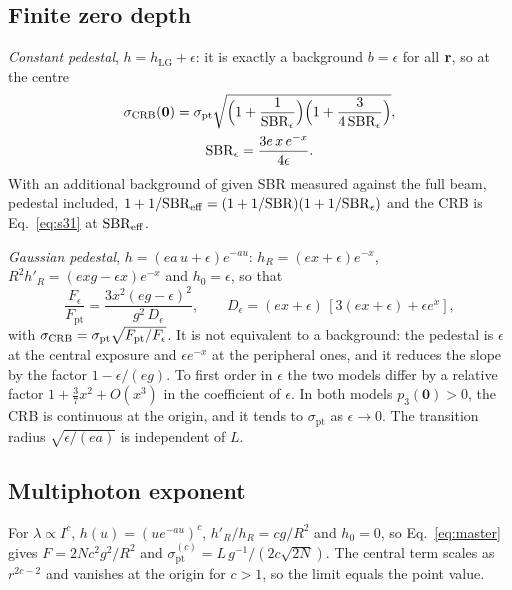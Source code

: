\subsection{Finite zero depth}
\emph{Constant pedestal}, $h=h_{\mathrm{LG}}+\epsilon$: it is exactly a background $b=\epsilon$
for all $\mathbf{r}$, so at the centre
\begin{equation}
\begin{gathered}
\sigma_{\mathrm{CRB}}(\mathbf0)=\sigma_{\mathrm{pt}}\sqrt{\Big(1+\frac{1}{\mathrm{SBR}_\epsilon}\Big)\Big(1+\frac{3}{4\,\mathrm{SBR}_\epsilon}\Big)},\\
\mathrm{SBR}_\epsilon=\frac{3e\,x\,e^{-x}}{4\epsilon}.
\end{gathered}
\end{equation}
With an additional background of given SBR measured against the full beam, pedestal included,
$1+1/\mathrm{SBR}_{\mathrm{eff}}=(1+1/\mathrm{SBR})(1+1/\mathrm{SBR}_\epsilon)$ and the CRB is Eq.~\eqref{eq:s31} at
$\mathrm{SBR}_{\mathrm{eff}}$.

\emph{Gaussian pedestal}, $h=(ea\,u+\epsilon)e^{-au}$: $h_R=(ex+\epsilon)e^{-x}$,
$R^2h'_R=(exg-\epsilon x)e^{-x}$ and $h_0=\epsilon$, so that
\begin{equation}
\frac{F_\epsilon}{F_{\mathrm{pt}}}=\frac{3x^2(eg-\epsilon)^2}{g^2\,D_\epsilon},\qquad
D_\epsilon=(ex+\epsilon)\,[3(ex+\epsilon)+\epsilon e^{x}],
\end{equation}
with $\sigma_{\mathrm{CRB}}=\sigma_{\mathrm{pt}}\sqrt{F_{\mathrm{pt}}/F_\epsilon}$.
It is not equivalent to a background: the pedestal is $\epsilon$ at the central exposure and
$\epsilon e^{-x}$ at the peripheral ones, and it reduces the slope by the factor
$1-\epsilon/(eg)$. To first order in $\epsilon$ the two models differ by a relative factor
$1+\tfrac37x^2+O(x^3)$ in the coefficient of $\epsilon$. In both models $p_3(\mathbf0)>0$, the
CRB is continuous at the origin, and it tends to $\sigma_{\mathrm{pt}}$ as $\epsilon\to0$. The
transition radius $\sqrt{\epsilon/(ea)}$ is independent of $L$.

\subsection{Multiphoton exponent}
For $\lambda\propto I^c$, $h(u)=(ue^{-au})^c$, $h'_R/h_R=cg/R^2$ and $h_0=0$, so
Eq.~\eqref{eq:master} gives $F=2Nc^2g^2/R^2$ and
$\sigma_{\mathrm{pt}}^{(c)}=L\,g^{-1}/(2c\sqrt{2N})$. The central term
scales as $r^{2c-2}$ and vanishes at the origin for $c>1$, so the limit equals the point value.
